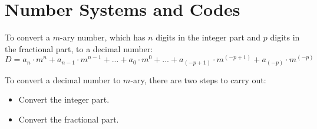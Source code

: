 \chapter{Number Systems and Codes}

        \par To convert a $m$-ary number, which has $n$ digits in the integer part and $p$ digits
        in the fractional part, to a decimal number:
        \begin{equation*}
            D = a_{n} \cdot m^{n} + a_{n - 1} \cdot m^{n - 1} + ... +
            a_{0} \cdot m^{0} + ... +
            a_{(-p + 1)} \cdot m^{(-p + 1)} + a_{(-p)} \cdot m^{(-p)}
        \end{equation*}
        \par To convert a decimal number to $m$-ary, there are two steps to carry out:
        \begin{itemize}
            \item Convert the integer part.
            \item Convert the fractional part.
        \end{itemize}
